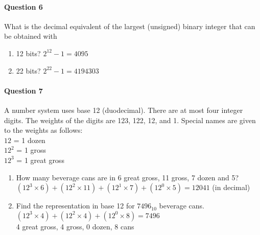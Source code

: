 \documentclass[12pt,letterpaper,notitlepage]{report}
\begin{document}
\paragraph{Question 6} 
What is the decimal equivalent of the largest (unsigned) binary integer that can be obtained with
\begin{enumerate}[label=\alph*)]
\item 12 bits? $ 2^{12}-1 = 4095 $
\item 22 bits? $ 2^{22}-1 = 4194303$
\end{enumerate}

\paragraph{Question 7} 
A number system uses base 12 (duodecimal). There are at most four integer digits. The weights of the digits are 123, 122, 12, and 1. Special names are given to the weights as follows:\\
$12$ = 1 dozen\\
$12^2$ = 1 gross\\
$12^3$ = 1 great gross
\begin{enumerate}[label=\alph*)]
\item How many beverage cans are in 6 great gross, 11 gross, 7 dozen and 5? \\
$ (12^3\times6)+(12^2\times11)+(12^1\times7)+(12^0\times5) = 12041 $ (in decimal)
\item Find the representation in base 12 for $7496_{10}$ beverage cans. \\
$(12^3\times4)+(12^2\times4)+(12^0\times8) = 7496$\\ 
4 great gross, 4 gross, 0 dozen, 8 cans
\end{enumerate}
\end{document}
